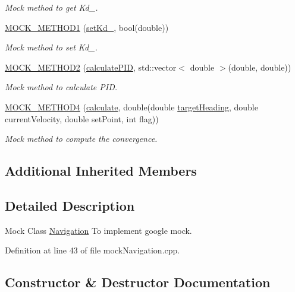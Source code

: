 \begin{DoxyCompactItemize}
\begin{DoxyCompactList}\small\item\em Mock method to get Kd\+\_\+. \end{DoxyCompactList}\item 
\hyperlink{class_mock_navigation_acb06c66920ae8ff1f96ba4c9b079deaf}{M\+O\+C\+K\+\_\+\+M\+E\+T\+H\+O\+D1} (\hyperlink{class_navigation_a4986e4357d9707ddf92cf8f559ef3dce}{set\+Kd\+\_\+}, bool(double))
\begin{DoxyCompactList}\small\item\em Mock method to set Kd\+\_\+. \end{DoxyCompactList}\item 
\hyperlink{class_mock_navigation_a6289387acc5f11297d7a765241a499b4}{M\+O\+C\+K\+\_\+\+M\+E\+T\+H\+O\+D2} (\hyperlink{class_navigation_ae8fc8426c7277de0b34aec951fc28e2c}{calculate\+P\+ID}, std\+::vector$<$ double $>$(double, double))
\begin{DoxyCompactList}\small\item\em Mock method to calculate P\+ID. \end{DoxyCompactList}\item 
\hyperlink{class_mock_navigation_a5189068e3bbe0eeb377a119eaa8f0b62}{M\+O\+C\+K\+\_\+\+M\+E\+T\+H\+O\+D4} (\hyperlink{class_navigation_a0f83b511cec12a68f2c3466c40c5d3cb}{calculate}, double(double \hyperlink{class_steer_algorithm_a071efeb53e86ee949940b0ab10986044}{target\+Heading}, double current\+Velocity, double set\+Point, int flag))
\begin{DoxyCompactList}\small\item\em Mock method to compute the convergence. \end{DoxyCompactList}\end{DoxyCompactItemize}
\subsection*{Additional Inherited Members}


\subsection{Detailed Description}
Mock Class \hyperlink{class_navigation}{Navigation} To implement google mock. 

Definition at line 43 of file mock\+Navigation.\+cpp.



\subsection{Constructor \& Destructor Documentation}
